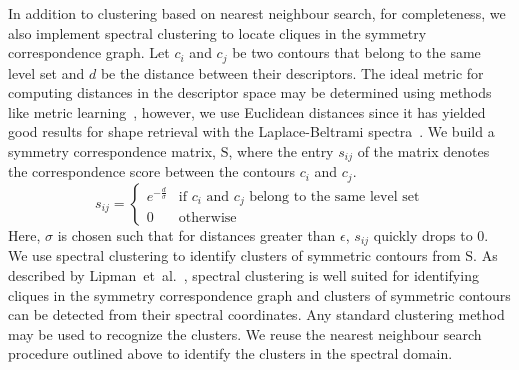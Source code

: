 \documentclass[review,journal]{vgtc}         %
\begin{document}
In addition to clustering based on nearest neighbour search,
for completeness, we also implement spectral clustering to locate cliques in the symmetry
correspondence graph.
Let $c_i$ and $c_j$ be two contours that belong to the same level set and $d$ be
the distance between their descriptors. The ideal metric for computing
distances in the descriptor space may be determined using methods like
metric learning~\cite{Kulis13}, however, we use
Euclidean distances since it has yielded good results 
for shape retrieval with the Laplace-Beltrami spectra~\cite{reuter2006laplace,lian2013}. 
We build a symmetry correspondence matrix, $\mathrm{S}$, where the entry $s_{ij}$ of the
matrix denotes the correspondence score between the contours $c_i$
and $c_j$.
$$s_{ij} = 
\begin{cases}
	e^{-\frac{d}{\sigma}} & \text{if $c_i$ and $c_j$ belong to the same level set}\\
	0 & \text{otherwise}
\end{cases}
$$
Here, $\sigma$ is chosen such that for distances greater than $\epsilon$, $s_{ij}$ quickly drops to 0.
We use spectral clustering
to identify clusters of symmetric contours from $\mathrm{S}$. As described by 
Lipman~et~al.~\cite{Lip10}, spectral clustering is well suited for identifying
cliques in the symmetry correspondence graph and clusters of symmetric
contours can be detected from their spectral coordinates. Any standard clustering
method may be used to recognize the clusters. We reuse the nearest neighbour search
procedure outlined above to identify the clusters in the spectral domain.
\end{document}
